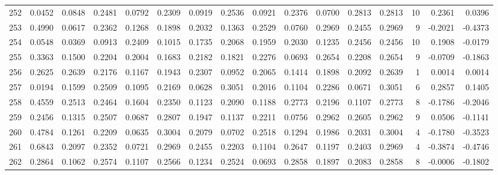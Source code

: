 \begin{tabular}{lrrrrrrrrrrrrrrr}
252 &      0.0452 &  0.0848 &  0.2481 &  0.0792 &  0.2309 &  0.0919 &  0.2536 &  0.0921 &  0.2376 &  0.0700 &   0.2813 &     0.2813 &     10 &                    0.2361 &                     0.0396 \\
253 &      0.4990 &  0.0617 &  0.2362 &  0.1268 &  0.1898 &  0.2032 &  0.1363 &  0.2529 &  0.0760 &  0.2969 &   0.2455 &     0.2969 &      9 &                   -0.2021 &                    -0.4373 \\
254 &      0.0548 &  0.0369 &  0.0913 &  0.2409 &  0.1015 &  0.1735 &  0.2068 &  0.1959 &  0.2030 &  0.1235 &   0.2456 &     0.2456 &     10 &                    0.1908 &                    -0.0179 \\
255 &      0.3363 &  0.1500 &  0.2204 &  0.2004 &  0.1683 &  0.2182 &  0.1821 &  0.2276 &  0.0693 &  0.2654 &   0.2208 &     0.2654 &      9 &                   -0.0709 &                    -0.1863 \\
256 &      0.2625 &  0.2639 &  0.2176 &  0.1167 &  0.1943 &  0.2307 &  0.0952 &  0.2065 &  0.1414 &  0.1898 &   0.2092 &     0.2639 &      1 &                    0.0014 &                     0.0014 \\
257 &      0.0194 &  0.1599 &  0.2509 &  0.1095 &  0.2169 &  0.0628 &  0.3051 &  0.2016 &  0.1104 &  0.2286 &   0.0671 &     0.3051 &      6 &                    0.2857 &                     0.1405 \\
258 &      0.4559 &  0.2513 &  0.2464 &  0.1604 &  0.2350 &  0.1123 &  0.2090 &  0.1188 &  0.2773 &  0.2196 &   0.1107 &     0.2773 &      8 &                   -0.1786 &                    -0.2046 \\
259 &      0.2456 &  0.1315 &  0.2507 &  0.0687 &  0.2807 &  0.1947 &  0.1137 &  0.2211 &  0.0756 &  0.2962 &   0.2605 &     0.2962 &      9 &                    0.0506 &                    -0.1141 \\
260 &      0.4784 &  0.1261 &  0.2209 &  0.0635 &  0.3004 &  0.2079 &  0.0702 &  0.2518 &  0.1294 &  0.1986 &   0.2031 &     0.3004 &      4 &                   -0.1780 &                    -0.3523 \\
261 &      0.6843 &  0.2097 &  0.2352 &  0.0721 &  0.2969 &  0.2455 &  0.2203 &  0.1104 &  0.2647 &  0.1197 &   0.2403 &     0.2969 &      4 &                   -0.3874 &                    -0.4746 \\
262 &      0.2864 &  0.1062 &  0.2574 &  0.1107 &  0.2566 &  0.1234 &  0.2524 &  0.0693 &  0.2858 &  0.1897 &   0.2083 &     0.2858 &      8 &                   -0.0006 &                    -0.1802 \\

\end{tabular}
